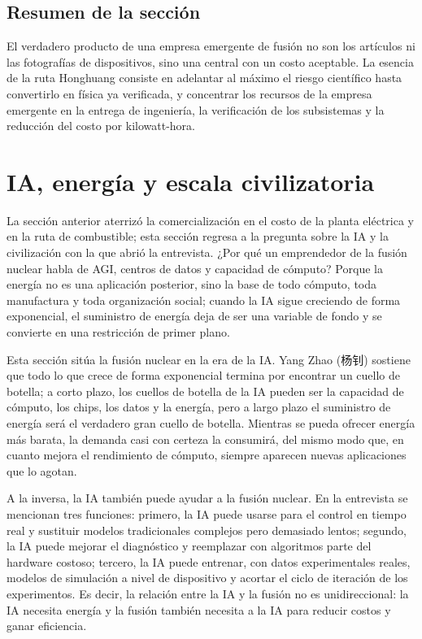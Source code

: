 \documentclass[a4paper]{article}
\begin{document}
\subsection{Resumen de la sección}

El verdadero producto de una empresa emergente de fusión no son los artículos ni las fotografías de dispositivos, sino una central con un costo aceptable. La esencia de la ruta Honghuang consiste en adelantar al máximo el riesgo científico hasta convertirlo en física ya verificada, y concentrar los recursos de la empresa emergente en la entrega de ingeniería, la verificación de los subsistemas y la reducción del costo por kilowatt-hora.
\section{IA, energía y escala civilizatoria}

La sección anterior aterrizó la comercialización en el costo de la planta eléctrica y en la ruta de combustible; esta sección regresa a la pregunta sobre la IA y la civilización con la que abrió la entrevista. ¿Por qué un emprendedor de la fusión nuclear habla de AGI, centros de datos y capacidad de cómputo? Porque la energía no es una aplicación posterior, sino la base de todo cómputo, toda manufactura y toda organización social; cuando la IA sigue creciendo de forma exponencial, el suministro de energía deja de ser una variable de fondo y se convierte en una restricción de primer plano.

Esta sección sitúa la fusión nuclear en la era de la IA. Yang Zhao (杨钊) sostiene que todo lo que crece de forma exponencial termina por encontrar un cuello de botella; a corto plazo, los cuellos de botella de la IA pueden ser la capacidad de cómputo, los chips, los datos y la energía, pero a largo plazo el suministro de energía será el verdadero gran cuello de botella. Mientras se pueda ofrecer energía más barata, la demanda casi con certeza la consumirá, del mismo modo que, en cuanto mejora el rendimiento de cómputo, siempre aparecen nuevas aplicaciones que lo agotan.

A la inversa, la IA también puede ayudar a la fusión nuclear. En la entrevista se mencionan tres funciones: primero, la IA puede usarse para el control en tiempo real y sustituir modelos tradicionales complejos pero demasiado lentos; segundo, la IA puede mejorar el diagnóstico y reemplazar con algoritmos parte del hardware costoso; tercero, la IA puede entrenar, con datos experimentales reales, modelos de simulación a nivel de dispositivo y acortar el ciclo de iteración de los experimentos. Es decir, la relación entre la IA y la fusión no es unidireccional: la IA necesita energía y la fusión también necesita a la IA para reducir costos y ganar eficiencia.
\end{document}
